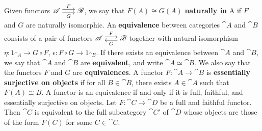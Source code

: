  Given functors $\cat A \maps{F}{G} \cat B$, we say that $F(A) \cong G(A)$ \textbf{naturally in} A if $F$ and $G$ are naturally isomorphic.
 An \textbf{equivalence} between categories $\cat A$ and $\cat B$ consists of a pair of functors $\cat A \isofuncs{F}{G} \cat B$ together with natural isomorphism $\eta: 1_{\cat A} \to G \circ F$, $\epsilon: F \circ G \to 1_{\cat B}$. If there exists an equivalence between $\cat A$ and $\cat B$, we say that $\cat A$ and $\cat B$ are \textbf{equivalent}, and write $\cat A \simeq \cat B$. We also say that the functors $F$ and $G$ are \textbf{equivalences}.
 A functor $F: \cat A \to \cat B$ is \textbf{essentially surjective on objects} if for all $B \in \cat B$, there exists $A \in \cat A$ such that $F(A) \cong B$.
 A functor is an equivalence if and only if it is full, faithful, and essentially surjective on objects.
 Let $F : \cat C \to \cat D$ be a full and faithful functor. Then $\cat C$ is equivalent to the full subcategory $\cat{C}'$ of $\cat D$ whose objects are those of the form $F(C)$ for some $C \in \cat C$.
